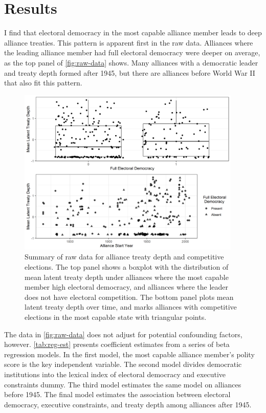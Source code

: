 \documentclass[12pt]{article}
\begin{document}
\section{Results}


I find that electoral democracy in the most capable alliance member leads to deep alliance treaties. 
This pattern is apparent first in the raw data. 
Alliances where the leading alliance member had full electoral democracy were deeper on average, as the top panel of \autoref{fig:raw-data} shows. 
Many alliances with a democratic leader and treaty depth formed after 1945, but there are alliances before World War II that also fit this pattern. 

\begin{figure}[hbtp]
\centering
\includegraphics[width=0.95\textwidth]{../figures/raw-data.png}
\caption{Summary of raw data for alliance treaty depth and competitive elections. The top panel shows a boxplot with the distribution of mean latent treaty depth under alliances where the most capable member high electoral democracy, and alliances where the leader does not have electoral competition. The bottom panel plots mean latent treaty depth over time, and marks alliances with competitive elections in the most capable state with triangular points. }
\label{fig:raw-data}
\end{figure}


The data in \autoref{fig:raw-data} does not adjust for potential confounding factors, however. 
\autoref{tab:reg-est} presents coefficient estimates from a series of beta regression models. 
In the first model, the most capable alliance member's polity score is the key independent variable. 
The second model divides democratic institutions into the lexical index of electoral democracy and executive constraints dummy.  
The third model estimates the same model on alliances before 1945. 
The final model estimates the association between electoral democracy, executive constraints, and treaty depth among alliances after 1945. 
\end{document}
